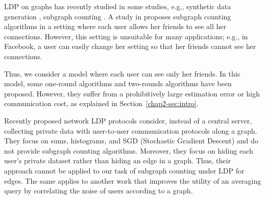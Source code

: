 LDP on graphs has recently studied in some studies, e.g., synthetic data generation \cite{qin2017generating}, subgraph counting \cite{Imola_USENIX21,Sun_CCS19,Ye_ICDE20,Ye_TKDE21}.
A study in
\cite{Sun_CCS19} proposes subgraph counting algorithms in a setting where each user
allows her friends to see all her connections.
However, this setting is unsuitable for
many applications; e.g., in Facebook, a user can easily change her setting so that
her friends cannot see her connections.



Thus, we consider a model where each user can see only her friends.
In this model, some one-round algorithms \cite{Ye_ICDE20,Ye_TKDE21}
and two-rounds algorithms\cite{Imola_USENIX21} have been proposed.
However, they suffer from a prohibitively large estimation error or high communication cost, as explained in Section~\ref{chap2-sec:intro}.

Recently proposed network LDP protocols \cite{Cyffers_arXiv21} consider, instead of a central server, collecting private data with user-to-user communication protocols along a graph. 
They focus on sums, histograms, and SGD (Stochastic Gradient Descent) and do not provide subgraph counting algorithms. 
Moreover, they focus on hiding each user's private dataset rather than hiding an edge in a graph. 
Thus, their approach cannot be applied to our task of subgraph counting under LDP for edges. 
The same applies to 
another work \cite{Sabater_arXiv21} 
that improves 
the utility of an averaging query
by correlating the noise of users according to a graph.

